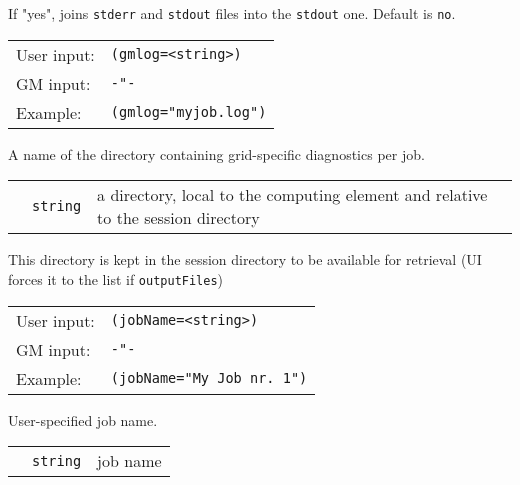   If "yes", joins \texttt{stderr} and  \texttt{stdout} files into
  the \texttt{stdout} one. Default is \verb#no#.

  \hspace*{0.5cm}
  \begin{shaded}
  \end{shaded}
  \begin{tabular}{lp{13cm}}
    User input:&\verb#(gmlog=<string>)#\\
    GM input:&\verb#-"-#\\
    Example:&\verb#(gmlog="myjob.log")#\\
  \end{tabular}

  A name of the directory containing grid-specific diagnostics per job.

  \begin{tabular}{llp{10cm}}
    \hspace*{1cm}&\texttt{string} & a directory, local to the computing element and
    relative to the session directory\\
  \end{tabular}

	This directory is kept in the session directory to be
	available for retrieval (UI forces it to the list if
	\texttt{outputFiles})

  \hspace*{0.5cm}
  \begin{shaded}
  \end{shaded}
  \begin{tabular}{lp{13cm}}
    User input:&\verb#(jobName=<string>)#\\
    GM input:&\verb#-"-#\\
    Example:&\verb#(jobName="My Job nr. 1")#\\
  \end{tabular}

  User-specified job name.

  \begin{tabular}{llp{10cm}}
    \hspace*{1cm}&\texttt{string} & job name\\
  \end{tabular}

